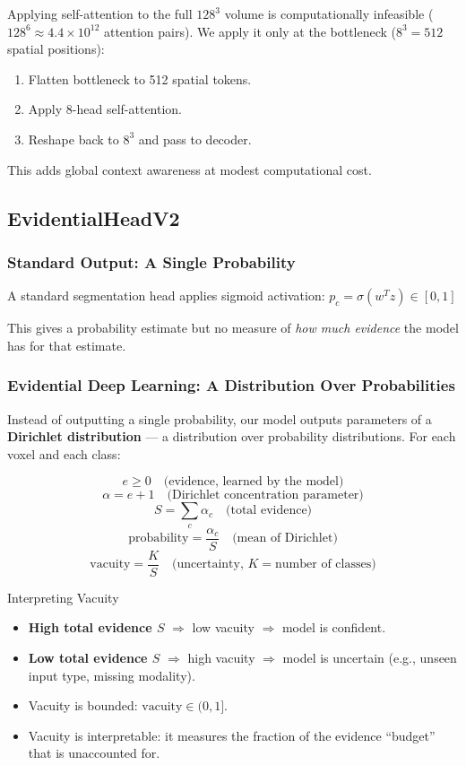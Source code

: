 \documentclass[12pt,a4paper]{article}
\newcommand{\term}[1]{\textbf{\textcolor{mainblue}{#1}}}
\begin{document}
Applying self-attention to the full $128^3$ volume is computationally infeasible ($128^6 \approx 4.4 \times 10^{12}$ attention pairs). We apply it only at the bottleneck ($8^3 = 512$ spatial positions):

\begin{enumerate}[noitemsep]
  \item Flatten bottleneck to 512 spatial tokens.
  \item Apply 8-head self-attention.
  \item Reshape back to $8^3$ and pass to decoder.
\end{enumerate}

This adds global context awareness at modest computational cost.

\subsection{EvidentialHeadV2}

\subsubsection{Standard Output: A Single Probability}

A standard segmentation head applies sigmoid activation:
$p_c = \sigma(w^T z) \in [0,1]$

This gives a probability estimate but no measure of \emph{how much evidence} the model has for that estimate.

\subsubsection{Evidential Deep Learning: A Distribution Over Probabilities}

Instead of outputting a single probability, our model outputs parameters of a \term{Dirichlet distribution} --- a distribution over probability distributions. For each voxel and each class:

\[
e \geq 0 \quad \text{(evidence, learned by the model)}
\]
\[
\alpha = e + 1 \quad \text{(Dirichlet concentration parameter)}
\]
\[
S = \sum_c \alpha_c \quad \text{(total evidence)}
\]
\[
\text{probability} = \frac{\alpha_c}{S} \quad \text{(mean of Dirichlet)}
\]
\[
\boxed{\text{vacuity} = \frac{K}{S}} \quad \text{(uncertainty, } K = \text{number of classes)}
\]

\begin{defbox}{Interpreting Vacuity}
\begin{itemize}[noitemsep]
  \item \textbf{High total evidence $S$} $\Rightarrow$ low vacuity $\Rightarrow$ model is confident.
  \item \textbf{Low total evidence $S$} $\Rightarrow$ high vacuity $\Rightarrow$ model is uncertain (e.g., unseen input type, missing modality).
  \item Vacuity is bounded: $\text{vacuity} \in (0, 1]$.
  \item Vacuity is interpretable: it measures the fraction of the evidence ``budget'' that is unaccounted for.
\end{itemize}
\end{defbox}
\end{document}
